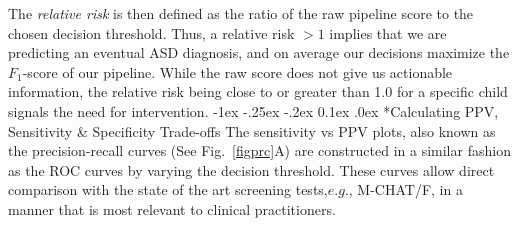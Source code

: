 \documentclass[onecolumn,,10pt]{IEEEtran}
\makeatletter
\renewcommand\subsection{\@startsection {section}{1}{\z@}%
  {-1ex \@plus -.25ex \@minus -.2ex}%
  {0.1ex \@plus.0ex}%
  {\fontsize{11}{12}\selectfont\bfseries\sffamily\color{DodgerBlue4}}}
\makeatother
\begin{document}
The \textit{relative risk} is then defined as the ratio of the raw pipeline score to the chosen decision threshold. Thus, a relative risk $>1$ implies that we are predicting an eventual ASD diagnosis, and on average our decisions maximize the $F_1$-score of our pipeline. While the raw score does not give us  actionable information,  the relative risk being close to or greater than 1.0 for a specific child signals the need for intervention.
\subsection*{Calculating PPV, Sensitivity \& Specificity Trade-offs}
The sensitivity vs PPV plots, also known as the precision-recall curves (See Fig.~\ref{figprc}A) are constructed in a similar fashion as the ROC curves by varying the decision threshold. These curves  allow direct comparison with the  state of the art screening tests,$e.g.$, M-CHAT/F, in a manner that is most relevant to clinical practitioners.


\end{document}

